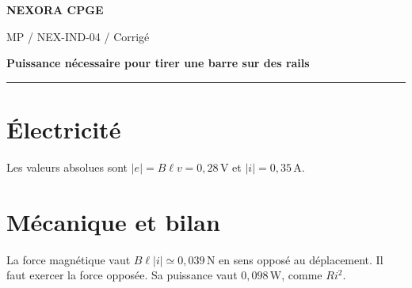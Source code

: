 \documentclass[11pt,a4paper]{article}
\begin{document}
{\small\bfseries\color{nexorablue} NEXORA CPGE}\par
{\small MP / NEX-IND-04 / Corrigé}\par
{\LARGE\bfseries Puissance nécessaire pour tirer une barre sur des rails}\par
\vspace{0.25em}\hrule\vspace{0.6em}

\section*{Électricité}
Les valeurs absolues sont $|e|=B\ell v=0{,}28\,\mathrm V$ et $|i|=0{,}35\,\mathrm A$.

\section*{Mécanique et bilan}
La force magnétique vaut $B\ell|i|\simeq0{,}039\,\mathrm N$ en sens opposé au déplacement. Il faut exercer la force opposée. Sa puissance vaut $0{,}098\,\mathrm W$, comme $Ri^2$.
\end{document}
